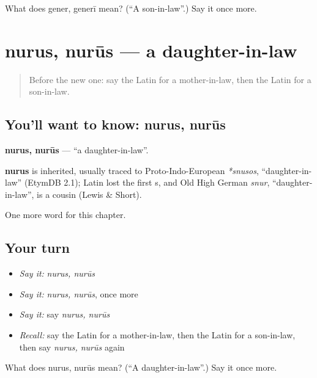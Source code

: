 \begin{tcolorbox}[breakable,colback=teal!4,colframe=teal!35!black,title={Before you move on}]
What does gener, generī mean? (\textquotedblleft{}A son-in-law\textquotedblright{}.) Say it once more.
\end{tcolorbox}
\section[nurus, nurūs]{nurus, nurūs — a daughter-in-law}

\label{lesson:LA-C247-nurus}



\begin{quote}
Before the new one: say the Latin for a mother-in-law, then the Latin for a son-in-law.
\end{quote}

\subsection*{You'll want to know: nurus, nurūs}
\textbf{nurus, nurūs} — \textquotedblleft{}a daughter-in-law\textquotedblright{}.

\begin{cousinweb}
\textbf{nurus} is inherited, usually traced to Proto-Indo-European \emph{*snusos}, \textquotedblleft{}daughter-in-law\textquotedblright{} (EtymDB 2.1); Latin lost the first s, and Old High German \emph{snur}, \textquotedblleft{}daughter-in-law\textquotedblright{}, is a cousin (Lewis \& Short).
\end{cousinweb}

\begin{grammarlens}[title={What you've built}]
One more word for this chapter.
\end{grammarlens}

\subsection*{Your turn}
\begin{itemize}
\raggedright
  \item \emph{Say it:} \emph{nurus, nurūs}
  \item \emph{Say it:} \emph{nurus, nurūs}, once more
  \item \emph{Say it:} say \emph{nurus, nurūs}
  \item \emph{Recall:} say the Latin for a mother-in-law, then the Latin for a son-in-law, then say \emph{nurus, nurūs} again
\end{itemize}

\begin{tcolorbox}[breakable,colback=teal!4,colframe=teal!35!black,title={Before you move on}]
What does nurus, nurūs mean? (\textquotedblleft{}A daughter-in-law\textquotedblright{}.) Say it once more.
\end{tcolorbox}

